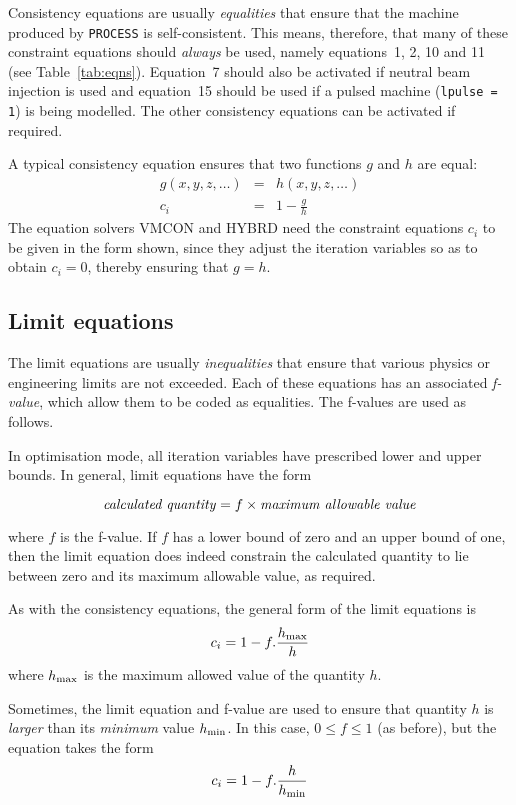 \documentclass[11pt,a4paper]{report}
\newcommand{\process}{\mbox{\texttt{PROCESS}}}
\begin{document}
Consistency equations are usually \textit{equalities}\/ that ensure that the
machine produced by \process\/ is self-consistent. This means, therefore, that many
of these constraint equations should \textit{always}\/ be used, namely
equations~1, 2, 10 and 11 (see Table~\ref{tab:eqns}).  Equation~7 should also
be activated if neutral beam injection is used and equation~15 should be used
if a pulsed machine (\texttt{lpulse = 1}) is being modelled.  The other
consistency equations can be activated if required.

A typical consistency equation ensures that two functions $g$ and $h$ are
equal:
\begin{eqnarray*}
g(x,y,z,\ldots) & = & h(x,y,z,\ldots) \\
c_i & = & 1 - \frac{g}{h}
\end{eqnarray*}
The equation solvers VMCON and HYBRD need the constraint equations $c_i$ to be
given in the form shown, since they adjust the iteration variables so as to
obtain $c_i = 0$, thereby ensuring that $g = h$.

\subsection{Limit equations}

The limit equations are usually \textit{inequalities}\/ that ensure that
various physics or engineering limits are not exceeded. Each of these
equations has an associated \textit{f-value}, which allow them to be coded as
equalities. The f-values are used as follows.

In optimisation mode, all iteration variables have prescribed lower and upper
bounds. In general, limit equations have the form

\[ \mbox{\textit{calculated quantity}} = f \times \mbox{\textit{maximum allowable
value}} \]

where $f$ is the f-value. If $f$ has a lower bound of zero and an upper bound
of one, then the limit equation does indeed constrain the calculated quantity
to lie between zero and its maximum allowable value, as required.

As with the consistency equations, the general form of the limit equations is
\[ c_i = 1 - f.\frac{h_{\mbox{\scriptsize max}}}{h} \]
where $h_{\mbox{\scriptsize max}}$ is the maximum allowed value of the quantity $h$.

Sometimes, the limit equation and f-value are used to ensure that quantity $h$
is \textit{larger}\/ than its \textit{minimum}\/ value $h_{\mbox{\scriptsize min}}$. In
this case, $0 \leq f \leq 1$ (as before), but the equation takes the form
\[ c_i = 1 - f.\frac{h}{h_{\mbox{\scriptsize min}}} \]
\end{document}
